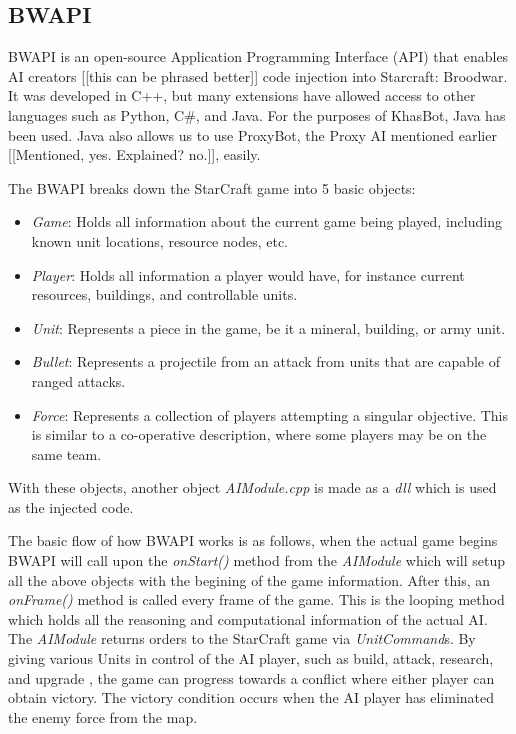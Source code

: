 \documentclass[letterpaper]{article}
\begin{document}
\subsection{BWAPI}
BWAPI is an open-source Application Programming Interface (API) that enables AI creators [[this can be phrased better]] code injection into Starcraft: Broodwar.  It was developed in C++, but many extensions have allowed access to other languages such as Python, C\#, and Java.  For the purposes of KhasBot, Java has been used.  Java also allows us to use ProxyBot, the Proxy AI mentioned earlier [[Mentioned, yes.  Explained? no.]], easily.

The BWAPI breaks down the StarCraft game into 5 basic objects: 
\begin{itemize}
\item \emph{Game}:  Holds all information about the current game being played, including known unit locations, resource nodes, etc. 
\item \emph{Player}:  Holds all information a player would have, for instance current resources, buildings, and controllable units.
\item \emph{Unit}: Represents a piece in the game, be it a mineral, building, or army unit.
\item \emph{Bullet}: Represents a projectile from an attack from units that are capable of ranged attacks.
\item \emph{Force}: Represents a collection of players attempting a singular objective.  This is similar to a co-operative description, where some players may be on the same team.
\end{itemize}

With these objects, another object \emph{AIModule.cpp} is made as a \emph{dll} which is used as the injected code.

The basic flow of how BWAPI works is as follows, when the actual game begins BWAPI will call upon the \emph{onStart()} method from the \emph{AIModule} which will setup all the above objects with the begining of the game information.  After this, an \emph{onFrame()} method is called every frame of the game.  This is the looping method which holds all the reasoning and computational information of the actual AI.  The \emph{AIModule} returns orders to the StarCraft game via \emph{UnitCommand}s.  By giving various Units in control of the AI player, such as build, attack, research, and upgrade , the game can progress towards a conflict where either player can obtain victory.  The victory condition occurs when the AI player has eliminated the enemy force from the map.
\end{document}
